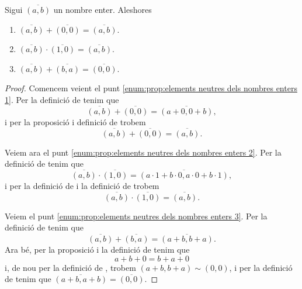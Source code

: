 \documentclass[../../Main.tex]{subfiles}
\begin{document}
	\begin{proposition}
		\label{prop:elements neutres dels nombres enters}
		\label{prop:Z és un grup}\label{prop:Z és un anell}
		Sigui \(\overline{(a,b)}\) un nombre enter. Aleshores
		\begin{enumerate}
			\item\label{enum:prop:elements neutres dels nombres enters 1} 
			\(\overline{(a,b)}+\overline{(0,0)}=\overline{(a,b)}\).
			\item\label{enum:prop:elements neutres dels nombres enters 2} 
			\(\overline{(a,b)}\cdot\overline{(1,0)}=\overline{(a,b)}\).
			\item\label{enum:prop:elements neutres dels nombres enters 3}
			\(\overline{(a,b)}+\overline{(b,a)}=\overline{(0,0)}\).
		\end{enumerate}
		\begin{proof}
			Comencem veient el punt \eqref{enum:prop:elements neutres dels nombres enters 1}. Per la definició de  tenim que
			\[\overline{(a,b)}+\overline{(0,0)}=\overline{(a+0,0+b)},\]
			i per la proposició  i definició de   trobem
			\[\overline{(a,b)}+\overline{(0,0)}=\overline{(a,b)}.\]
			
			Veiem ara el punt \eqref{enum:prop:elements neutres dels nombres enters 2}. Per la definició de  tenim que 
			\[\overline{(a,b)}\cdot\overline{(1,0)}=\overline{(a\cdot 1+b\cdot 0,a\cdot0+b\cdot1)},\]
			i per la definició de  i la definició de  trobem
			\[\overline{(a,b)}\cdot\overline{(1,0)}=\overline{(a,b)}.\]
			
			Veiem el punt \eqref{enum:prop:elements neutres dels nombres enters 3}. Per la definició de  tenim que
			\[\overline{(a,b)}+\overline{(b,a)}=\overline{(a+b,b+a)}.\]
			Ara bé, per la proposició  i la definició de  tenim que
			\[a+b+0=b+a+0\]
			i, de nou per la definició de , trobem \((a+b,b+a)\sim(0,0)\), i per la definició de  tenim que \(\overline{(a+b,a+b)}=\overline{(0,0)}\).
		\end{proof}
	\end{proposition}
\end{document}
